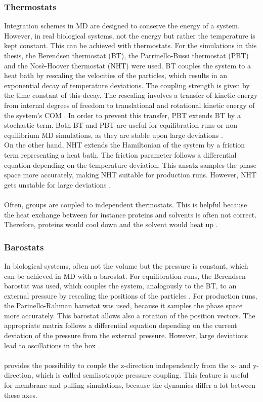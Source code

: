\subsubsection{Thermostats}
Integration schemes in MD are designed to conserve the energy of a system. However, in real biological systems, not the energy but rather the temperature is kept constant. This can be achieved with thermostats. For the simulations in this thesis, the Berendsen thermostat \autocite{berendsen} (BT), the Parrinello-Bussi thermostat \autocite{parinelloBussi} (PBT) and the Nosè-Hoover thermostat \autocites{nosehooverthermo}{nosehooverthermo2} (NHT) were used. BT couples the system to a heat bath by rescaling the velocities of the particles, which results in an exponential decay of temperature deviations. The coupling strength is given by the time constant of this decay. The rescaling involves a transfer of kinetic energy from internal degrees of freedom to translational and rotational kinetic energy of the system's COM \autocite{velRescaleSucks}. In order to prevent this transfer, PBT extends BT by a stochastic term. Both BT and PBT are useful for equilibration runs or non-equilibrium MD simulations, as they are stable upon large deviations \autocites{berendsen}[p. 31]{gromacsManual}.\\
On the other hand, NHT extends the Hamiltonian of the system by a friction term representing a heat bath. The friction parameter follows a differential equation depending on the temperature deviation. This ansatz samples the phase space more accurately, making NHT suitable for production runs. However, NHT gets unstable for large deviations \autocite[p. 32-33]{gromacsManual}.\\
\\
Often, groups are coupled to independent thermostats. This is helpful because the heat exchange between for instance proteins and solvents is often not correct. Therefore, proteins would cool down and the solvent would heat up \autocite[p. 34]{gromacsManual}.
\subsubsection{Barostats}
In biological systems, often not the volume but the pressure is constant, which can be achieved in MD with a barostat. For equilibration runs, the Berendsen barostat \autocite{berendsen} was used, which couples the system, analogously to the BT, to an external pressure by rescaling the positions of the particles \autocite[p. 36]{gromacsManual}. For production runs, the Parinello-Rahman barostat \autocites{parinelloBarostat}{parinelloBarostat2} was used, because it samples the phase space more accurately. This barostat allows also a rotation of the position vectors. The appropriate matrix follows a differential equation depending on the current deviation of the pressure from the external pressure. However, large deviations lead to oscillations in the box \autocite[p. 36]{gromacsManual}.\\
\\
\gromacs{} provides the possibility to couple the z-direction independently from the x- and y-direction, which is called semiisotropic pressure coupling. This feature is useful for membrane and pulling simulations, because the dynamics differ a lot between these axes.
